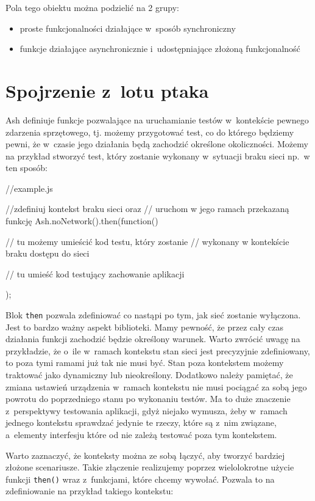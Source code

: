 \documentclass{xmgr}
\begin{document}
Pola tego obiektu można podzielić na 2 grupy:  
\begin{itemize}
  \item proste funkcjonalności działające w~sposób synchroniczny
  \item funkcje działające asynchronicznie i~udostępniające złożoną funkcjonalność
\end{itemize}

\section{Spojrzenie z~lotu ptaka}

Ash definiuje funkcje pozwalające na uruchamianie testów w~kontekście pewnego zdarzenia sprzętowego, tj. możemy przygotować test, co do którego będziemy pewni, że w~czasie jego działania będą zachodzić określone okoliczności. Możemy na przykład stworzyć test, który zostanie wykonany w~sytuacji braku sieci np.~w ten sposób:

\begin{javascriptcode}
  //example.js

  //zdefiniuj kontekst braku sieci oraz 
  //  uruchom w jego ramach przekazaną funkcję
  Ash.noNetwork().then(function(){
    //  tu możemy umieścić kod testu, który zostanie 
    //    wykonany w kontekście braku dostępu do sieci 

    // tu umieść kod testujący zachowanie aplikacji  
  });
\end{javascriptcode}

Blok \texttt{then} pozwala zdefiniować co nastąpi po tym, jak sieć zostanie wyłączona. Jest to bardzo ważny aspekt biblioteki. Mamy pewność, że przez cały czas działania funkcji zachodzić będzie określony warunek. Warto zwrócić uwagę na przykładzie, że o~ile w~ramach kontekstu stan sieci jest precyzyjnie zdefiniowany, to poza tymi ramami już tak nie musi być. Stan poza kontekstem możemy traktować jako dynamiczny lub nieokreślony. Dodatkowo należy pamiętać, że zmiana ustawień urządzenia w~ramach kontekstu nie musi pociągać za sobą jego powrotu do poprzedniego stanu po wykonaniu testów. Ma to duże znaczenie z~perspektywy testowania aplikacji, gdyż niejako wymusza, żeby w~ramach jednego kontekstu sprawdzać jedynie te rzeczy, które są z~nim związane, a~elementy interfesju które od nie zależą testować poza tym kontekstem.

Warto zaznaczyć, że konteksty można ze sobą łączyć, aby tworzyć bardziej złożone scenariusze. Takie złączenie realizujemy poprzez wielolokrotne użycie funkcji \texttt{then()} wraz z~funkcjami, które chcemy wywołać. Pozwala to na zdefiniowanie na przykład takiego kontekstu:
\end{document}
